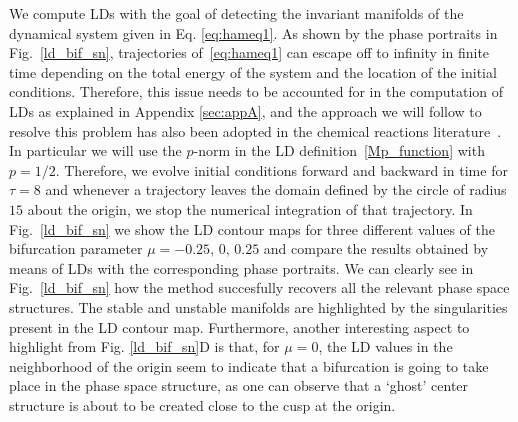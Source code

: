 \documentclass{ws-ijbc}
\begin{document}
We compute LDs with the goal of detecting the invariant manifolds of the dynamical system given in Eq. \eqref{eq:hameq1}. As shown by the phase portraits in Fig.~\ref{ld_bif_sn}, trajectories of~\eqref{eq:hameq1} can escape off to infinity in finite time depending on the total energy of the system and the location of the initial conditions. Therefore, this issue needs to be accounted for in the computation of LDs as explained in Appendix \ref{sec:appA}, and the approach we will follow to resolve this problem has also been adopted in the chemical reactions literature~\cite{craven2015lagrangian,craven2017lagrangian}. In particular we will use the $p$-norm in the LD definition~\eqref{Mp_function} with $p = 1/2$. Therefore, we evolve initial conditions forward and backward in time for $\tau = 8$ and whenever a trajectory leaves the domain defined by the circle of radius $15$ about the origin, we stop the numerical integration of that trajectory. In Fig.~\ref{ld_bif_sn} we show the LD contour maps for three different values of the bifurcation parameter $\mu = -0.25, \, 0, \, 0.25$ and compare the results obtained by means of LDs with the corresponding phase portraits. We can clearly see in Fig.~\ref{ld_bif_sn} how the method succesfully recovers all the relevant phase space structures. The stable and unstable manifolds are highlighted by the singularities present in the LD contour map. Furthermore, another interesting aspect to highlight from Fig. \ref{ld_bif_sn}D is that, for $\mu = 0$, the LD values in the neighborhood of the origin seem to indicate that a bifurcation is going to take place in the phase space structure, as one can observe that a `ghost' center structure is about to be created close to the cusp at the origin.
\end{document}
